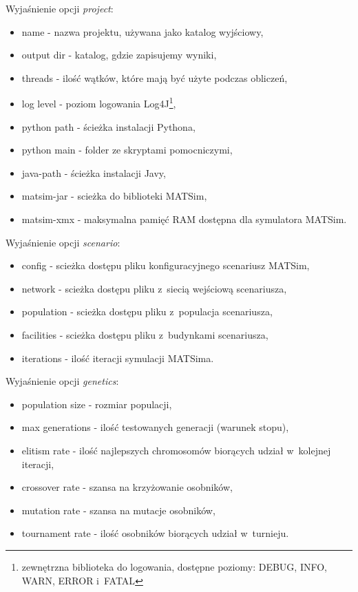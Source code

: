 \documentclass[twoside,12pt]{report}
\begin{document}
\vspace*{15px}

Wyjaśnienie opcji \textit{project}:
\begin{itemize}
\item name - nazwa projektu, używana jako katalog wyjściowy,
\item output dir - katalog, gdzie zapisujemy wyniki,
\item threads - ilość wątków, które mają być użyte podczas obliczeń,
\item log level - poziom logowania Log4J\footnote{zewnętrzna biblioteka do logowania, dostępne poziomy: DEBUG, INFO, WARN, ERROR i~FATAL},
\item python path - ścieżka instalacji Pythona,
\item python main - folder ze skryptami pomocniczymi,
\item java-path - ścieżka instalacji Javy,
\item matsim-jar - scieżka do biblioteki MATSim,
\item matsim-xmx - maksymalna pamięć RAM dostępna dla symulatora MATSim.
\end{itemize}

\vspace*{15px}

Wyjaśnienie opcji \textit{scenario}:
\begin{itemize}
\item config - scieżka dostępu pliku konfiguracyjnego scenariusz MATSim,
\item network - scieżka dostępu pliku z~siecią wejściową scenariusza,
\item population - scieżka dostępu pliku z~populacja scenariusza,
\item facilities - scieżka dostępu pliku z~budynkami scenariusza,
\item iterations - ilość iteracji symulacji MATSima.
\end{itemize}

\vspace*{15px}

Wyjaśnienie opcji \textit{genetics}:
\begin{itemize}
\item population size - rozmiar populacji,
\item max generations - ilość testowanych generacji (warunek stopu),
\item elitism rate - ilość najlepszych chromosomów biorących udział w~kolejnej iteracji,
\item crossover rate - szansa na krzyżowanie osobników,
\item mutation rate - szansa na mutacje osobników,
\item tournament rate - ilość osobników biorących udział w~turnieju.
\end{itemize}
\end{document}
